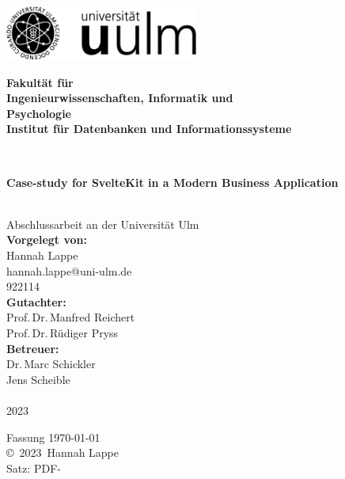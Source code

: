 \documentclass[a4paper,
fontsize=12pt,
headsepline,           %
oneside,               %
number=noenddot,       %
bibliography=totoc,    %
BCOR=15mm              %
]{scrbook}
\makeatletter
\newcommand{\fullname}{Hannah Lappe}
\newcommand{\email}{hannah.lappe@uni-ulm.de}
\newcommand{\titel}{Case-study for SvelteKit in a Modern Business Application}
\newcommand{\jahr}{2023}
\newcommand{\matnr}{922114}
\newcommand{\gutachterA}{Prof.\,Dr.\,Manfred Reichert}
\newcommand{\gutachterB}{Prof.\,Dr.\,Rüdiger Pryss}
\newcommand{\betreuer}{Dr.\,Marc Schickler\\Jens Scheible}
\newcommand{\fakultaet}{Ingenieurwissenschaften, Informatik und\\Psychologie}
\newcommand{\institut}{Institut für Datenbanken und Informationssysteme}
\makeatother
\begin{document}
\frontmatter

\thispagestyle{empty}
\begin{addmargin*}[4mm]{-10mm}

  \hfill
  \includegraphics[height=1.8cm]{assets/logo_uulm_sw.png}\\[1em]

  {\footnotesize
  \hspace*{115mm}\parbox[t]{35mm}{\bfseries Fakultät für\\
    \fakultaet\\
    \mdseries \institut}\\[2cm]

  \parbox{140mm}{\bfseries \LARGE \titel}\\[2.5em]
  {\footnotesize Abschlussarbeit an der Universität Ulm}\\[3em]

  {\footnotesize \bfseries Vorgelegt von:}\\
  {\footnotesize \fullname\\ \email}\\ \matnr\\[2em]
  {\footnotesize \bfseries Gutachter:}\\
  {\footnotesize \gutachterA\\ \gutachterB}\\[2em]
  {\footnotesize \bfseries Betreuer:}\\
  {\footnotesize \betreuer}\\\\
  {\footnotesize \jahr}
  }
\end{addmargin*}


\clearpage
\thispagestyle{empty}
{ \small
  \flushleft
  Fassung \today \\\vfill
  \copyright~\jahr~\fullname\\[0.5em]
  Satz: PDF-\LaTeXe
}
\end{document}
